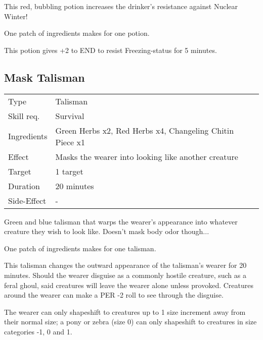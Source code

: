 \documentclass[11pt,a4paper,twocolumn]{book}
\begin{document}
\medskip

This red, bubbling potion increases the drinker's resistance against Nuclear Winter!

One patch of ingredients makes for one potion.

This potion gives +2 to END to resist Freezing-status for 5 minutes.


\vfill

\subsection*{Mask Talisman}
{
	\begin{tabu} to 75mm{| X[l,4] | X[l,8] |}
		\hline
		Type 			& Talisman 													\\
		Skill req.	    & Survival  												\\
		Ingredients     & Green Herbs x2, Red Herbs x4, Changeling  Chitin Piece x1	\\
		Effect     		& Masks the wearer into looking like another creature 		\\
		Target      	& 1 target													\\
		Duration  		& 20 minutes	 											\\
		Side-Effect     & -															\\ \hline
	\end{tabu}
	
}

\medskip

Green and blue talisman that warps the wearer's appearance into whatever creature they wish to look like. Doesn't mask body odor though...

One patch of ingredients makes for one talisman.

This talisman changes the outward appearance of the talisman's wearer for 20 minutes. Should the wearer disguise as a commonly hostile creature, such as a feral ghoul, said creatures will leave the wearer alone unless provoked. Creatures around the wearer can make a PER -2 roll to see through the disguise.

The wearer can only shapeshift to creatures up to 1 size increment away from their normal size; a pony or zebra (size 0) can only shapeshift to creatures in size categories -1, 0 and 1.

\vfill
\end{document}
